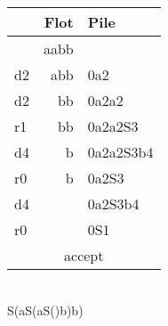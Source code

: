 \documentclass[12pt]{article}
\begin{document}
\begin{tabular}{l r|l}
 & Flot & Pile \\ 
\hline
 & aabb & \\ 
d2 & abb & 0a2\\ 
d2 & bb & 0a2a2\\ 
r1 & bb & 0a2a2S3\\ 
d4 & b & 0a2a2S3b4\\ 
r0 & b & 0a2S3\\ 
d4 &  & 0a2S3b4\\ 
r0 &  & 0S1\\ 
\multicolumn{3}{c}{accept} \\ 
\end{tabular} \\ 

S(aS(aS()b)b)
\end{document}
